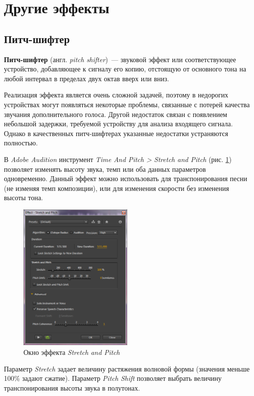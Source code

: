 \documentclass[oneside, final, 14pt]{extreport}
\begin{document}
\section{Другие эффекты}
\subsection{Питч-шифтер}
\textbf{Питч-шифтер} (англ. \textit{pitch shifter})~--- звуковой эффект или соответствующее устройство, добавляющее к сигналу его копию, отстоящую от основного тона на любой интервал в пределах двух октав вверх или вниз.

Реализация эффекта является очень сложной задачей, поэтому в недорогих устройствах могут появляться некоторые проблемы, связанные с потерей качества звучания дополнительного голоса. Другой недостаток связан с появлением небольшой задержки, требуемой устройству для анализа входящего сигнала. Однако в качественных питч-шифтерах указанные недостатки устраняются полностью.

В \emph{Adobe Audition} инструмент \textit{Time And Pitch > Stretch and Pitch} (рис. \ref{pic-austretch-01}) позволяет изменять высоту звука, темп или оба данных параметров одновременно. Данный эффект можно использовать для транспонирования песни (не изменяя темп композиции), или для изменения скорости без изменения высоты тона.

\begin{figure}[h!]
  \centering
  \includegraphics[width=0.5\textwidth]{pic-austretch-01}
  \caption{Окно эффекта \emph{Stretch and Pitch}}
  \label{pic-austretch-01}
\end{figure}

Параметр \textit{Stretch} задает величину растяжения волновой формы (значения меньше 100\% задают сжатие). Параметр \textit{Pitch Shift} позволяет выбрать величину транспонирования высоты звука в полутонах.
\end{document}
